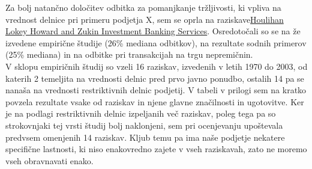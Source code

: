 \documentclass[12pt,a4paper]{amsart}
\theoremstyle{definition} %
\theoremstyle{plain} %
\begin{document}
\begin{itemize}
Za bolj natančno določitev odbitka za pomanjkanje tržljivosti, ki vpliva na vrednost delnice pri primeru podjetja X, sem se oprla na raziskave\newline \underline{Houlihan Lokey Howard and Zukin Investment Banking Services}. \newline Osredotočali so se na že izvedene empirične študije (26\% mediana odbitkov), na rezultate sodnih primerov (25\% mediana) in na odbitke pri transakcijah na trgu nepremičnin.\\
V sklopu empiričnih študij so vzeli 16 raziskav, izvedenih v letih 1970 do 2003, od katerih 2 temeljita na vrednosti delnic pred prvo javno ponudbo, ostalih 14 pa se nanaša na vrednosti restriktivnih delnic podjetij. V tabeli v prilogi sem na kratko povzela rezultate vsake od raziskav in njene glavne značilnosti in ugotovitve. Ker je na podlagi restriktivnih delnic izpeljanih več raziskav, poleg tega pa so strokovnjaki tej vrsti študij bolj naklonjeni, sem pri ocenjevanju upoštevala predvsem omenjenih 14 raziskav. Kljub temu pa ima naše podjetje nekatere specifične lastnosti, ki niso enakovredno zajete v vseh raziskavah, zato ne moremo vseh obravnavati enako.\par


\end{itemize}
\end{document}

